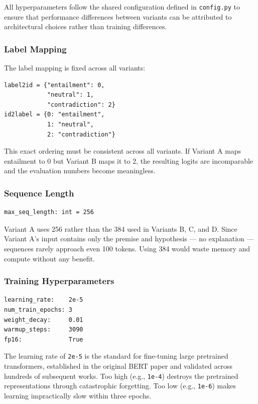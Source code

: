All hyperparameters follow the shared configuration defined in
\texttt{config.py} to ensure that performance differences between
variants can be attributed to architectural choices rather than
training differences.

\subsubsection{Label Mapping}

The label mapping is fixed across all variants:

\begin{verbatim}
label2id = {"entailment": 0,
            "neutral": 1,
            "contradiction": 2}
id2label = {0: "entailment",
            1: "neutral",
            2: "contradiction"}
\end{verbatim}

This exact ordering must be consistent across all variants. If Variant
A maps entailment to 0 but Variant B maps it to 2, the resulting
logits are incomparable and the evaluation numbers become meaningless.

\subsubsection{Sequence Length}

\begin{verbatim}
max_seq_length: int = 256
\end{verbatim}

Variant A uses 256 rather than the 384 used in Variants B, C, and D.
Since Variant A's input contains only the premise and hypothesis --- no
explanation --- sequences rarely approach even 100 tokens. Using 384
would waste memory and compute without any benefit.

\subsubsection{Training Hyperparameters}

\begin{verbatim}
learning_rate:    2e-5
num_train_epochs: 3
weight_decay:     0.01
warmup_steps:     3090
fp16:             True
\end{verbatim}

The learning rate of \texttt{2e-5} is the standard for fine-tuning
large pretrained transformers, established in the original BERT paper
and validated across hundreds of subsequent works. Too high (e.g.,
\texttt{1e-4}) destroys the pretrained representations through
catastrophic forgetting. Too low (e.g., \texttt{1e-6}) makes learning
impractically slow within three epochs.

